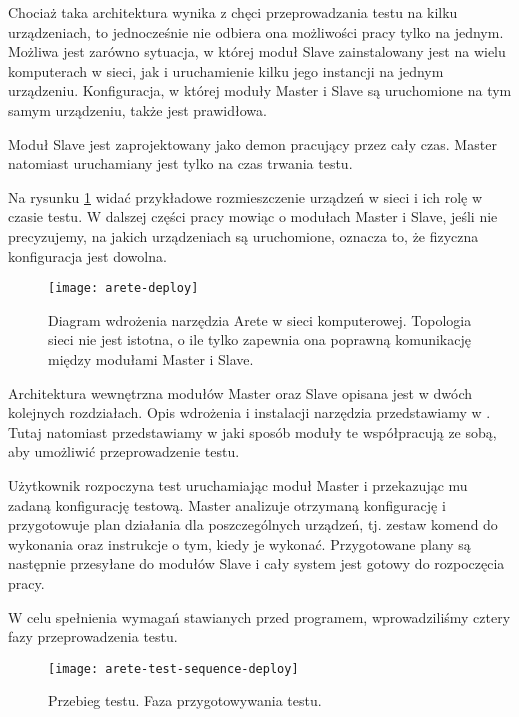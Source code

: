 \documentclass[00-praca-magisterska.tex]{subfiles}
\begin{document}
Chociaż taka architektura wynika z chęci przeprowadzania testu na kilku
urządzeniach, to jednocześnie nie odbiera ona możliwości pracy tylko na jednym.
Możliwa jest zarówno sytuacja, w której moduł Slave zainstalowany jest na
wielu komputerach w sieci, jak i uruchamienie kilku jego instancji na
jednym urządzeniu. Konfiguracja, w której moduły Master i Slave są uruchomione
na tym samym urządzeniu, także jest prawidłowa.

Moduł Slave jest zaprojektowany jako demon pracujący przez cały czas. Master
natomiast uruchamiany jest tylko na czas trwania testu.

Na rysunku \ref{fig:arete-deploy} widać przykładowe rozmieszczenie urządzeń w
sieci i ich rolę w czasie testu. W dalszej części pracy mowiąc o modułach
Master i Slave, jeśli nie precyzujemy, na jakich urządzeniach są uruchomione,
oznacza to, że fizyczna konfiguracja jest dowolna.

\begin{figure}
\begin{center}
\leavevmode
\texttt{[image: arete-deploy]}
\end{center}
\caption{Diagram wdrożenia narzędzia Arete w sieci komputerowej. Topologia
sieci nie jest istotna, o ile tylko zapewnia ona poprawną komunikację między
modułami Master i Slave.}
\label{fig:arete-deploy}
\end{figure}

Architektura wewnętrzna modułów Master oraz Slave opisana jest w dwóch
kolejnych rozdziałach. Opis wdrożenia i instalacji narzędzia przedstawiamy w
. Tutaj natomiast przedstawiamy w jaki sposób
moduły te współpracują ze sobą, aby umożliwić przeprowadzenie testu.

Użytkownik rozpoczyna test uruchamiając moduł Master i przekazując mu zadaną
konfigurację testową. Master analizuje otrzymaną konfigurację i przygotowuje
plan działania dla poszczególnych urządzeń, tj. zestaw komend do wykonania oraz
instrukcje o tym, kiedy je wykonać. Przygotowane plany są następnie przesyłane
do modułów Slave i cały system jest gotowy do rozpoczęcia pracy.

W celu spełnienia wymagań stawianych przed programem, wprowadziliśmy cztery
fazy przeprowadzenia testu.

\begin{figure}
\begin{center}
\leavevmode
\texttt{[image: arete-test-sequence-deploy]}
\end{center}
\caption{Przebieg testu. Faza przygotowywania testu.}
\label{fig:arete-test-seq-deploy}
\end{figure}
\end{document}
